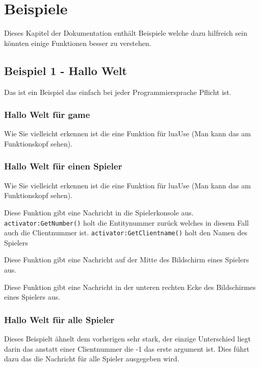 \documentclass[11pt,a4paper]{book}
\begin{document}
\chapter{Beispiele}
\label{examples}
Dieses Kapitel der Dokumentation enthält Beispiele welche dazu hilfreich sein könnten einige Funktionen besser zu verstehen.
\section{Beispiel 1 - Hallo Welt}
\label{example1}
Das ist ein Beispiel das einfach bei jeder Programmiersprache Pflicht ist.
\subsection{Hallo Welt für game}
\label{example11}

Wie Sie vielleicht erkennen ist die eine Funktion für luaUse (Man kann das am Funktionskopf sehen).
\subsection{Hallo Welt für einen Spieler}
\label{example12}

Wie Sie vielleicht erkennen ist die eine Funktion für luaUse (Man kann das am Funktionskopf sehen).

Diese Funktion gibt eine Nachricht in die Spielerkonsole aus.
\newline
\lstinline|activator:GetNumber()| holt die Entitynummer zurück welches in diesem Fall auch die Clientnummer ist.
\newline
\lstinline|activator:GetClientname()| holt den Namen des Spielers

Diese Funktion gibt eine Nachricht auf der Mitte des Bildschirm eines Spielers aus.

Diese Funktion gibt eine Nachricht in der unteren rechten Ecke des Bildschirmes eines Spielers aus.
\subsection{Hallo Welt für alle Spieler}
\label{example13}

Dieses Beispielt ähnelt dem vorherigen sehr stark, der einzige Unterschied liegt darin das anstatt einer Clientnummer die -1 das erste argument ist. Dies führt dazu das die Nachricht für alle Spieler ausgegeben wird.
\end{document}
